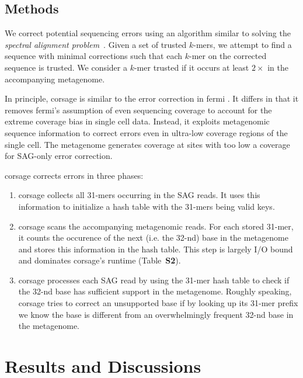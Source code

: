 \documentclass{bioinfo}
\begin{document}
\begin{methods}
\section{Methods}

We correct potential sequencing errors using an algorithm similar to solving the \emph{spectral alignment problem}~\citep{euler}.
Given a set of trusted $k$-mers, we attempt to find a sequence with minimal corrections such that each $k$-mer on the corrected sequence is trusted.
We consider a $k$-mer trusted if it occurs at least $2\times$ in the accompanying metagenome. %

In principle, corsage is similar to the error correction in fermi \citep{fermi}.
It differs in that it removes fermi's assumption of even sequencing coverage to account for the extreme coverage bias in single cell data.
Instead, it exploits metagenomic sequence information to correct errors even in ultra-low coverage regions of the single cell.
The metagenome generates coverage at sites with too low a coverage for SAG-only error correction.

corsage corrects errors in three phases:
\begin{enumerate}
\item corsage collects all 31-mers occurring in the SAG reads. It uses this information to initialize a hash table with the 31-mers being valid keys.
\item corsage scans the accompanying metagenomic reads. For each stored 31-mer, it counts the occurence of the next (i.e. the 32-nd) base in the metagenome and stores this information in the hash table. This step is largely I/O bound and dominates corsage's runtime (Table~\textbf{S2}). %
\item corsage processes each SAG read by using the 31-mer hash table to check if the 32-nd base has sufficient support in the metagenome.
Roughly speaking, corsage tries to correct an unsupported base if by looking up its 31-mer prefix we know the base is different from an overwhelmingly frequent 32-nd base in the metagenome.
\end{enumerate}

\end{methods}

\section{Results and Discussions}
\end{document}
